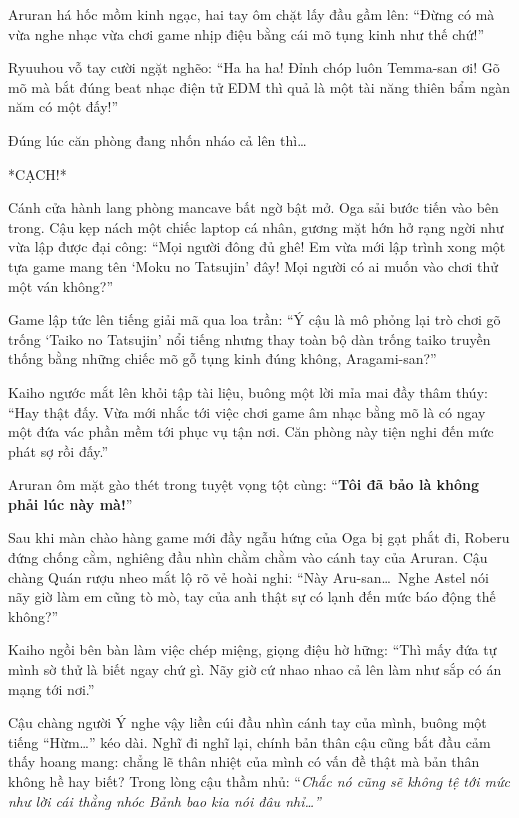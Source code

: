 \documentclass[../main.tex]{subfiles}
\begin{document}

Aruran há hốc mồm kinh ngạc, hai tay ôm chặt lấy đầu gầm lên: ``Đừng có mà vừa nghe nhạc vừa chơi game nhịp điệu bằng cái mõ tụng kinh như thế chứ!''

Ryuuhou vỗ tay cười ngặt nghẽo: ``Ha ha ha! Đỉnh chóp luôn Temma-san ơi! Gõ mõ mà bắt đúng beat nhạc điện tử EDM thì quả là một tài năng thiên bẩm ngàn năm có một đấy!''

Đúng lúc căn phòng đang nhốn nháo cả lên thì\dots

*CẠCH!*

Cánh cửa hành lang phòng mancave bất ngờ bật mở. Oga sải bước tiến vào bên trong. Cậu kẹp nách một chiếc laptop cá nhân, gương mặt hớn hở rạng ngời như vừa lập được đại công: ``Mọi người đông đủ ghê! Em vừa mới lập trình xong một tựa game mang tên `Moku no Tatsujin' đây! Mọi người có ai muốn vào chơi thử một ván không?''


Game lập tức lên tiếng giải mã qua loa trần: ``Ý cậu là mô phỏng lại trò chơi gõ trống `Taiko no Tatsujin' nổi tiếng nhưng thay toàn bộ dàn trống taiko truyền thống bằng những chiếc mõ gỗ tụng kinh đúng không, Aragami-san?''

Kaiho ngước mắt lên khỏi tập tài liệu, buông một lời mỉa mai đầy thâm thúy: ``Hay thật đấy. Vừa mới nhắc tới việc chơi game âm nhạc bằng mõ là có ngay một đứa vác phần mềm tới phục vụ tận nơi. Căn phòng này tiện nghi đến mức phát sợ rồi đấy.''

Aruran ôm mặt gào thét trong tuyệt vọng tột cùng: ``\textbf{Tôi đã bảo là không phải lúc này mà!}''

\ct

Sau khi màn chào hàng game mới đầy ngẫu hứng của Oga bị gạt phắt đi, Roberu đứng chống cằm, nghiêng đầu nhìn chằm chằm vào cánh tay của Aruran. Cậu chàng Quán rượu nheo mắt lộ rõ vẻ hoài nghi: ``Này Aru-san\dots\ Nghe Astel nói nãy giờ làm em cũng tò mò, tay của anh thật sự có lạnh đến mức báo động thế không?''

Kaiho ngồi bên bàn làm việc chép miệng, giọng điệu hờ hững: ``Thì mấy đứa tự mình sờ thử là biết ngay chứ gì. Nãy giờ cứ nhao nhao cả lên làm như sắp có án mạng tới nơi.''

Cậu chàng người Ý nghe vậy liền cúi đầu nhìn cánh tay của mình, buông một tiếng ``Hừm\dots'' kéo dài. Nghĩ đi nghĩ lại, chính bản thân cậu cũng bắt đầu cảm thấy hoang mang: chẳng lẽ thân nhiệt của mình có vấn đề thật mà bản thân không hề hay biết? Trong lòng cậu thầm nhủ: ``\textit{Chắc nó cũng sẽ không tệ tới mức như lời cái thằng nhóc Bảnh bao kia nói đâu nhỉ\dots''}
\end{document}
